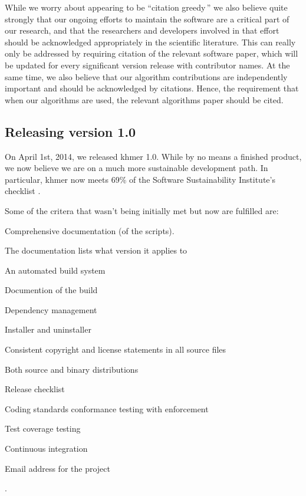 \documentclass[12pt]{article}
\begin{document}
While we worry about appearing to be ``citation greedy\,'' we also
believe quite strongly that our ongoing efforts to maintain the
software are a critical part of our research, and that the researchers
and developers involved in that effort should be acknowledged
appropriately in the scientific literature.  This can really only be
addressed by requiring citation of the relevant software paper, which
will be updated for every significant version release with contributor
names.  At the same time, we also believe that our algorithm
contributions are independently important and should be acknowledged
by citations.  Hence, the requirement that when our algorithms are
used, the relevant algorithms paper should be cited.

\subsection{Releasing version 1.0}

On April 1st, 2014, we released khmer 1.0.  While by no means a
finished product, we now believe we are on a much more sustainable
development path.  In particular, khmer now meets 69\% of the Software
Sustainability Institute's checklist \cite{khmer-1.0-assessment}.

Some of the critera that wasn't being initially met but now are fulfilled are:
\begin{inparaenum}[(A)] \item Comprehensive documentation (of the scripts).
  \item The documentation lists what version it applies to \item An automated
  build system \item Documention of the build \item Dependency management \item
  Installer and uninstaller \item Consistent copyright and license statements
  in all source files \item Both source and binary distributions \item Release
  checklist \item Coding standards conformance testing with enforcement \item
  Test coverage testing \item Continuous integration \item Email address for
  the project \end{inparaenum}.
\end{document}
